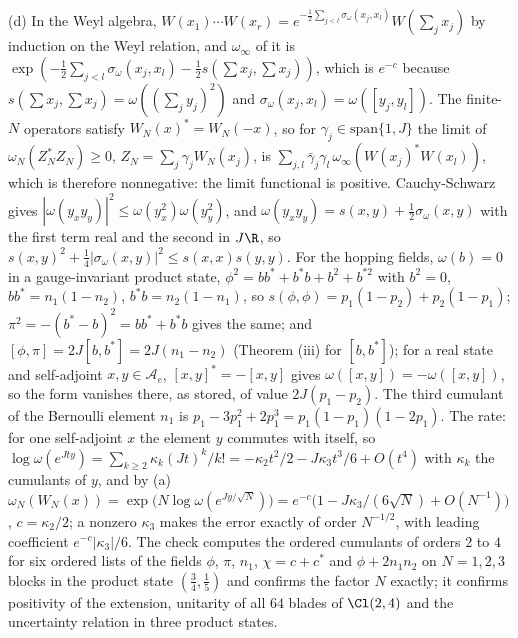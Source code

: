 (d) In the Weyl algebra, $W(x_{1})\cdots W(x_{r}) = e^{-\frac12\sum_{j < l}\sigma_{\omega}(x_{j}, x_{l})}W(\sum_{j}x_{j})$ by induction on the Weyl relation, and $\omega_{\infty}$ of it is $\exp(-\tfrac12\sum_{j < l}\sigma_{\omega}(x_{j}, x_{l}) - \tfrac12 s(\sum x_{j}, \sum x_{j}))$, which is $e^{-c}$ because $s(\sum x_{j}, \sum x_{j}) = \omega((\sum_{j}y_{j})^{2})$ and $\sigma_{\omega}(x_{j}, x_{l}) = \omega([y_{j}, y_{l}])$. The finite-$N$ operators satisfy $W_{N}(x)^{*} = W_{N}(-x)$, so for $\gamma_{j} \in \mathrm{span}\{1, J\}$ the limit of $\omega_{N}(Z_{N}^{*}Z_{N}) \ge 0$, $Z_{N} = \sum_{j}\gamma_{j}W_{N}(x_{j})$, is $\sum_{j, l}\bar\gamma_{j}\gamma_{l}\,\omega_{\infty}(W(x_{j})^{*}W(x_{l}))$, which is therefore nonnegative: the limit functional is positive. Cauchy-Schwarz gives $|\omega(y_{x}y_{y})|^{2} \le \omega(y_{x}^{2})\omega(y_{y}^{2})$, and $\omega(y_{x}y_{y}) = s(x, y) + \tfrac12\sigma_{\omega}(x, y)$ with the first term real and the second in $J\R$, so $s(x, y)^{2} + \tfrac14|\sigma_{\omega}(x, y)|^{2} \le s(x, x)s(y, y)$. For the hopping fields, $\omega(b) = 0$ in a gauge-invariant product state, $\phi^{2} = bb^{*} + b^{*}b + b^{2} + b^{*2}$ with $b^{2} = 0$, $bb^{*} = n_{1}(1 - n_{2})$, $b^{*}b = n_{2}(1 - n_{1})$, so $s(\phi, \phi) = p_{1}(1 - p_{2}) + p_{2}(1 - p_{1})$; $\pi^{2} = -(b^{*} - b)^{2} = bb^{*} + b^{*}b$ gives the same; and $[\phi, \pi] = 2J[b, b^{*}] = 2J(n_{1} - n_{2})$ (Theorem (iii) for $[b, b^{*}]$); for a real state and self-adjoint $x, y \in \mathcal{A}_{e}$, $[x, y]^{*} = -[x, y]$ gives $\omega([x, y]) = -\omega([x, y])$, so the form vanishes there, as stored, of value $2J(p_{1} - p_{2})$. The third cumulant of the Bernoulli element $n_{1}$ is $p_{1} - 3p_{1}^{2} + 2p_{1}^{3} = p_{1}(1 - p_{1})(1 - 2p_{1})$. The rate: for one self-adjoint $x$ the element $y$ commutes with itself, so $\log\omega(e^{Jty}) = \sum_{k \ge 2}\kappa_{k}(Jt)^{k}/k! = -\kappa_{2}t^{2}/2 - J\kappa_{3}t^{3}/6 + O(t^{4})$ with $\kappa_{k}$ the cumulants of $y$, and by (a) $\omega_{N}(W_{N}(x)) = \exp\bigl(N\log\omega(e^{Jy/\sqrt N})\bigr) = e^{-c}\bigl(1 - J\kappa_{3}/(6\sqrt N) + O(N^{-1})\bigr)$, $c = \kappa_{2}/2$; a nonzero $\kappa_{3}$ makes the error exactly of order $N^{-1/2}$, with leading coefficient $e^{-c}|\kappa_{3}|/6$. The check computes the ordered cumulants of orders $2$ to $4$ for six ordered lists of the fields $\phi$, $\pi$, $n_{1}$, $\chi = c + c^{*}$ and $\phi + 2n_{1}n_{2}$ on $N = 1, 2, 3$ blocks in the product state $(\tfrac34, \tfrac15)$ and confirms the factor $N$ exactly; it confirms positivity of the extension, unitarity of all $64$ blades of $\Cl(2,4)$ and the uncertainty relation in three product states.

